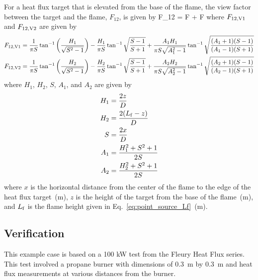\noindent For a heat flux target that is elevated from the base of the flame, the view factor between the target and the flame, $F_{12}$, is given by
\be
F_{12} = F + F
\label{eq:solid_flame_F12_V1V2}
\ee
where $F\sb{12, V1}$ and $F\sb{12, V2}$ are given by
\begin{align}
F\sb{12, V1} &= \frac{1}{\pi S} \tan^{-1} \left( \frac{H_1}{\sqrt{S^2-1}} \right) - \frac{H_1}{\pi S} \tan^{-1} \sqrt{\frac{S-1}{S+1}} +
\frac{A_1 H_1}{\pi S \sqrt{A_1^2-1}} \tan^{-1} \sqrt{\frac{(A_1+1)(S-1)}{(A_1-1)(S+1)}} \\
F\sb{12, V2} &= \frac{1}{\pi S} \tan^{-1} \left( \frac{H_2}{\sqrt{S^2-1}} \right) - \frac{H_2}{\pi S} \tan^{-1} \sqrt{\frac{S-1}{S+1}} +
\frac{A_2 H_2}{\pi S \sqrt{A_2^2-1}} \tan^{-1} \sqrt{\frac{(A_2+1)(S-1)}{(A_2-1)(S+1)}}
\label{eq:solid_flame_F12_V1_V2}
\end{align}
where $H_1$, $H_2$, $S$, $A_1$, and $A_2$ are given by
\begin{align}
H_1 &= \frac{2 z}{D}                \\
H_2 &= \frac{2 (L\sb{f}-z)}{D}      \\
S   &= \frac{2 x}{D}                \\
A_1 &= \frac{H_1^2 + S^2 + 1}{2 S}  \\
A_2 &= \frac{H_2^2 + S^2 + 1}{2 S}
\label{eq:solid_flame_H_S_A}
\end{align}
where $x$ is the horizontal distance from the center of the flame to the edge of the heat
flux target~(\si{m}), $z$ is the height of the target from the base of the flame~(\si{m}),
and $L\sb{f}$ is the flame height given in Eq.~\ref{eq:point_source_Lf}~(\si{m}).


\clearpage


\subsection*{Verification}

This example case is based on a 100 kW test from the Fleury Heat Flux series. This test involved a propane burner with dimensions of 0.3~m by 0.3~m and heat flux measurements at various distances from the burner.

